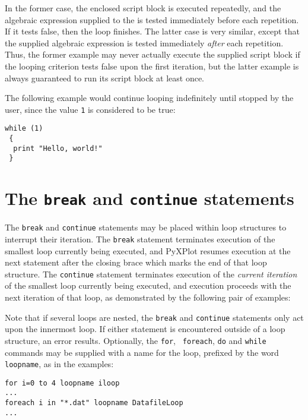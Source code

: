In the former case, the enclosed script block is executed repeatedly, and the
algebraic expression supplied to the  is tested immediately
before each repetition. If it tests false, then the loop finishes.  The latter
case is very similar, except that the supplied algebraic expression is tested
immediately {\it after} each repetition. Thus, the former example may never
actually execute the supplied script block if the looping criterion tests false
upon the first iteration, but the latter example is always guaranteed to run
its script block at least once.

The following example would continue looping indefinitely until stopped by the
user, since the value {\tt 1} is considered to be true:

\begin{verbatim}
while (1)
 {
  print "Hello, world!"
 }
\end{verbatim}

\section{The {\tt break} and {\tt continue} statements}
\label{sec:breakcontinue}

The {\tt break} and {\tt continue} statements may be placed within loop
structures to interrupt their iteration. The {\tt break} statement terminates
execution of the smallest loop currently being executed, and PyXPlot resumes
execution at the next statement after the closing brace which marks the end of
that loop structure. The {\tt continue} statement terminates execution of the
{\it current iteration} of the smallest loop currently being executed, and
execution proceeds with the next iteration of that loop, as demonstrated by the
following pair of examples:

\vspace{3mm}

\vspace{3mm}

Note that if several loops are nested, the {\tt break} and {\tt continue}
statements only act upon the innermost loop. If either statement is encountered
outside of a loop structure, an error results. Optionally, the {\tt for}, {\tt
foreach}, {\tt do} and {\tt while} commands may be supplied with a name for the
loop, prefixed by the word {\tt loopname}, as in the examples:

\begin{verbatim}
for i=0 to 4 loopname iloop
...
foreach i in "*.dat" loopname DatafileLoop
...
\end{verbatim}

